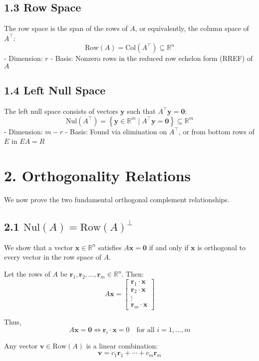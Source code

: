 \documentclass[11pt]{article}
\begin{document}
\subsection*{1.3 Row Space}
The row space is the span of the rows of \( A \), or equivalently, the column space of \( A^\top \):
\[
\mathrm{Row}(A) = \mathrm{Col}(A^\top) \subseteq \mathbb{R}^n
\]
- Dimension: \( r \)
- Basis: Nonzero rows in the reduced row echelon form (RREF) of \( A \)

\subsection*{1.4 Left Null Space}
The left null space consists of vectors \( \mathbf{y} \) such that \( A^\top \mathbf{y} = \mathbf{0} \):
\[
\mathrm{Nul}(A^\top) = \left\{ \mathbf{y} \in \mathbb{R}^m \mid A^\top \mathbf{y} = \mathbf{0} \right\} \subseteq \mathbb{R}^m
\]
- Dimension: \( m - r \)
- Basis: Found via elimination on \( A^\top \), or from bottom rows of \( E \) in \( EA = R \)

\section*{2. Orthogonality Relations}

We now prove the two fundamental orthogonal complement relationships.

\subsection*{2.1 \( \mathrm{Nul}(A) = \mathrm{Row}(A)^\perp \)}

We show that a vector \( \mathbf{x} \in \mathbb{R}^n \) satisfies \( A\mathbf{x} = \mathbf{0} \) if and only if \( \mathbf{x} \) is orthogonal to every vector in the row space of \( A \).

Let the rows of \( A \) be \( \mathbf{r}_1, \mathbf{r}_2, \dots, \mathbf{r}_m \in \mathbb{R}^n \). Then:
\[
A\mathbf{x} = 
\begin{bmatrix}
\mathbf{r}_1 \cdot \mathbf{x} \\
\mathbf{r}_2 \cdot \mathbf{x} \\
\vdots \\
\mathbf{r}_m \cdot \mathbf{x}
\end{bmatrix}
\]

Thus,
\[
A\mathbf{x} = \mathbf{0} \iff \mathbf{r}_i \cdot \mathbf{x} = 0 \quad \text{for all } i = 1, \dots, m
\]

Any vector \( \mathbf{v} \in \mathrm{Row}(A) \) is a linear combination:
\[
\mathbf{v} = c_1 \mathbf{r}_1 + \cdots + c_m \mathbf{r}_m
\]
\end{document}
